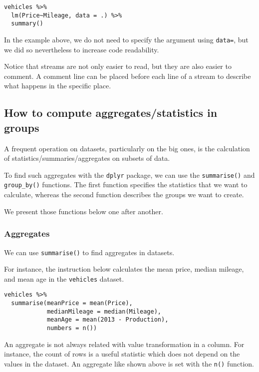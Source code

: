 \documentclass[]{book}
\theoremstyle{definition}
\theoremstyle{definition}
\theoremstyle{definition}
\theoremstyle{remark}
\begin{document}
\begin{verbatim}
vehicles %>%
  lm(Price~Mileage, data = .) %>%
  summary()
\end{verbatim}

In the example above, we do not need to specify the argument using
\texttt{data=}, but we did so nevertheless to increase code readability.

Notice that streams are not only easier to read, but they are also
easier to comment. A comment line can be placed before each line of a
stream to describe what happens in the specific place.

\subsection{How to compute aggregates/statistics in
groups}\label{part_256}

A frequent operation on datasets, particularly on the big ones, is the
calculation of statistics/summaries/aggregates on subsets of data.

To find such aggregates with the \texttt{dplyr} package, we can use the
\texttt{summarise()} and \texttt{group\_by()} functions. The first
function specifies the statistics that we want to calculate, whereas the
second function describes the groups we want to create.

We present those functions below one after another.

\subsubsection*{Aggregates}\label{aggregates}

We can use \texttt{summarise()} to find aggregates in datasets.

For instance, the instruction below calculates the mean price, median
mileage, and mean age in the \texttt{vehicles} dataset.

\begin{verbatim}
vehicles %>%
  summarise(meanPrice = mean(Price),
            medianMileage = median(Mileage),
            meanAge = mean(2013 - Production),
            numbers = n())
\end{verbatim}

An aggregate is not always related with value transformation in a
column. For instance, the count of rows is a useful statistic which does
not depend on the values in the dataset. An aggregate like shown above
is set with the \texttt{n()} function.
\end{document}
